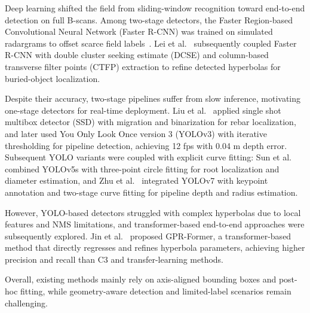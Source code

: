 \documentclass[lettersize,journal]{IEEEtran}
\begin{document}
Deep learning shifted the field from sliding-window recognition toward end-to-end detection on full B-scans.
Among two-stage detectors, the Faster Region-based Convolutional Neural Network (Faster R-CNN) was trained
on simulated radargrams to offset scarce field labels~\cite{pham2018fasterrcnn}.
Lei et al.~\cite{lei2019autohyperbola} subsequently coupled Faster R-CNN with double cluster seeking estimate (DCSE) and column-based transverse filter points (CTFP) extraction to refine detected hyperbolas for buried-object localization.

Despite their accuracy, two-stage pipelines suffer from slow inference, motivating one-stage detectors for real-time deployment.
Liu et al.~\cite{LIU2020103279,liu2022pipeline} applied single shot multibox detector (SSD) with migration and binarization for rebar localization, and later used You Only Look Once version 3 (YOLOv3) with iterative thresholding for pipeline detection, achieving 12 fps with 0.04 m depth error.
Subsequent YOLO variants were coupled with explicit curve fitting:
Sun et al.~\cite{agronomy13020344} combined YOLOv5s with three-point circle fitting for root localization and diameter estimation,
and Zhu et al.~\cite{rs15082114} integrated YOLOv7 with keypoint annotation and two-stage curve fitting for pipeline depth and radius estimation.

However, YOLO-based detectors struggled with complex hyperbolas due to local features and NMS limitations, and transformer-based end-to-end approaches were subsequently explored.
Jin et al.~\cite{jin2024gprformer} proposed GPR-Former, a transformer-based method that directly regresses and refines hyperbola parameters, achieving higher precision and recall than C3 and transfer-learning methods.

Overall, existing methods mainly rely on axis-aligned bounding boxes and post-hoc fitting, while geometry-aware detection and limited-label scenarios remain challenging.
\end{document}
